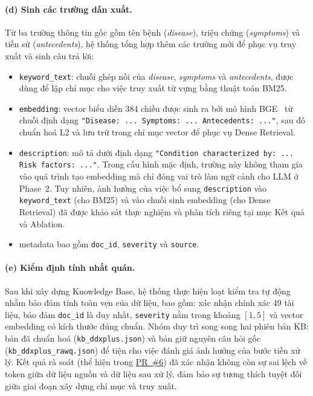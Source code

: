 \paragraph{(d) Sinh các trường dẫn xuất.}
Từ ba trường thông tin gốc gồm tên bệnh (\textit{disease}), triệu chứng (\textit{symptoms}) và tiền sử (\textit{antecedents}), hệ thống tổng hợp thêm các trường mới để phục vụ truy xuất và sinh câu trả lời:
\begin{itemize}[leftmargin=1.4em,itemsep=2pt]
    \item \texttt{keyword\_text}: chuỗi ghép nối của \textit{disease}, \textit{symptoms} và \textit{antecedents}, được dùng để lập chỉ mục cho việc truy xuất từ vựng bằng thuật toán BM25.
    \item \texttt{embedding}: vector biểu diễn 384 chiều được sinh ra bởi mô hình BGE~\cite{xiao2024cpack} từ chuỗi định dạng \texttt{"Disease: ... Symptoms: ... Antecedents: ..."}, sau đó chuẩn hoá L2 và lưu trữ trong chỉ mục vector để phục vụ Dense Retrieval.
    \item \texttt{description}: mô tả dưới định dạng \texttt{"Condition characterized by: ... Risk factors: ..."}. Trong cấu hình mặc định, trường này không tham gia vào quá trình tạo embedding mà chỉ đóng vai trò làm ngữ cảnh cho LLM ở Phase~2. Tuy nhiên, ảnh hưởng của việc bổ sung \texttt{description} vào \texttt{keyword\_text} (cho BM25) và vào chuỗi sinh embedding (cho Dense Retrieval) đã được khảo sát thực nghiệm và phân tích riêng tại mục Kết quả và Ablation.
    \item metadata bao gồm \texttt{doc\_id}, \texttt{severity} và \texttt{source}.
\end{itemize}

\paragraph{(e) Kiểm định tính nhất quán.}
Sau khi xây dựng Knowledge Base, hệ thống thực hiện loạt kiểm tra tự động nhằm bảo đảm tính toàn vẹn của dữ liệu, bao gồm: xác nhận chính xác 49 tài liệu, bảo đảm \texttt{doc\_id} là duy nhất, \texttt{severity} nằm trong khoảng $[1,5]$ và vector embedding có kích thước đúng chuẩn. Nhóm duy trì song song hai phiên bản KB: bản đã chuẩn hoá (\texttt{kb\_ddxplus.json}) và bản giữ nguyên câu hỏi gốc (\texttt{kb\_ddxplus\_rawq.json}) để tiện cho việc đánh giá ảnh hưởng của bước tiền xử lý. Kết quả rà soát (thể hiện trong \href{https://github.com/AIVIETNAM-AIO-Lucyna/Disease-Diagnosis-RAG-System/pull/6}{PR~\#6}) đã xác nhận không còn sự sai lệch về token giữa dữ liệu nguồn và dữ liệu sau xử lý, đảm bảo sự tương thích tuyệt đối giữa giai đoạn xây dựng chỉ mục và truy xuất.

